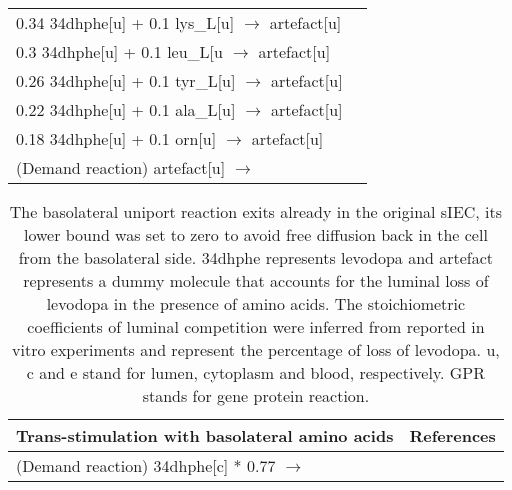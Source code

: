 \begin{table}[h]
\begin{center}
\begin{tabularx}{\textwidth}{L{10.5cm}L{4cm}}
	0.34 34dhphe[u] + 0.1 lys\_L[u] $\rightarrow$ artefact[u]&    \\
	0.3 34dhphe[u] + 0.1 leu\_L[u $\rightarrow$ artefact[u] &    \\
	0.26 34dhphe[u] + 0.1 tyr\_L[u] $\rightarrow$ artefact[u] & \cite{camargo2014molecular,verrey2000glycoprotein}   \\
	0.22 34dhphe[u] + 0.1 ala\_L[u] $\rightarrow$ artefact[u] &    \\
	0.18 34dhphe[u] + 0.1 orn[u] $\rightarrow$ artefact[u] &    \\
	(Demand reaction) artefact[u] $\rightarrow$ &    \\
	\hline
	\end{tabularx}
\end{center}
\label{tbl:tbls3}%
\end{table}

\clearpage
\begin{table}[h]
\caption*{Table \ref{tbl:tbls3}: Continued}
\begin{center}
	\begin{tabularx}{\textwidth}{L{10.5cm}L{4cm}}
	\hline
	\textbf{Trans-stimulation with basolateral amino acids}        &      \textbf{References}     \\ 
	\hline
	(Demand reaction) 34dhphe[c] * 0.77 $\rightarrow$ &  \cite{camargo2014molecular}   \\
	\hline
	\end{tabularx}
\end{center}
\caption*{The basolateral uniport reaction exits already in the original sIEC, its lower bound was set to zero to avoid free diffusion back in the cell from the basolateral side. 34dhphe represents levodopa and artefact represents a dummy molecule that accounts for the luminal loss of levodopa in the presence of amino acids. The stoichiometric coefficients of luminal competition were inferred from reported in vitro experiments and represent the percentage of loss of levodopa. u, c and e stand for lumen, cytoplasm and blood, respectively. GPR stands for gene protein reaction.}
\label{tbl:tbls31}%
\end{table}

